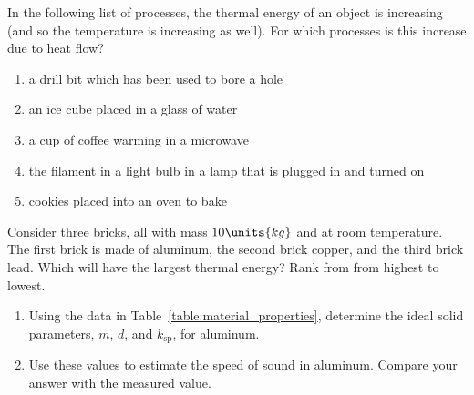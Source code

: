 \begin{problem}
  In the following list of processes, the thermal energy of an object
  is increasing (and so the temperature is increasing as well).  For
  which processes is this increase due to heat flow?
\begin{enumerate}
\item a drill bit which has been used to bore a hole
\item an ice cube placed in a glass of water
\item a cup of coffee warming in a microwave
\item the filament in a light bulb in a lamp that is plugged in and turned on
\item cookies placed into an oven to bake
\end{enumerate}
\label{problem:heat_examples}
\end{problem}

\begin{problem}
  Consider three bricks, all with mass $10\units{kg}$ and at room
  temperature. The first brick is made of aluminum, the second brick
  copper, and the third brick lead.  Which will have the largest thermal
  energy?  Rank from from highest to lowest.
\label{problem:compare_heat_capacity}
\end{problem}

\begin{problem}
\begin{enumerate}
\item Using the data in Table~\ref{table:material_properties}, 
determine the ideal solid
parameters, $m$, $d$, and $k_\text{sp}$, for aluminum.
\item Use these values to estimate the speed of sound in aluminum.  Compare
your answer with the measured value.
\end{enumerate}
\end{problem}


